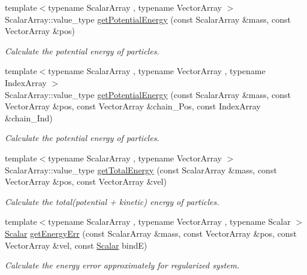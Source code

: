 \begin{DoxyCompactItemize}
{\footnotesize template$<$typename Scalar\+Array , typename Vector\+Array $>$ }\\Scalar\+Array\+::value\+\_\+type \mbox{\hyperlink{namespace_space_h_aecd56c4b16c8c9e47d4083c52db1640a}{get\+Potential\+Energy}} (const Scalar\+Array \&mass, const Vector\+Array \&pos)
\begin{DoxyCompactList}\small\item\em Calculate the potential energy of particles. \end{DoxyCompactList}\item 
{\footnotesize template$<$typename Scalar\+Array , typename Vector\+Array , typename Index\+Array $>$ }\\Scalar\+Array\+::value\+\_\+type \mbox{\hyperlink{namespace_space_h_a8796203b0c912b1137302096c8539cda}{get\+Potential\+Energy}} (const Scalar\+Array \&mass, const Vector\+Array \&pos, const Vector\+Array \&chain_\+Pos, const Index\+Array \&chain_\+Ind)
\begin{DoxyCompactList}\small\item\em Calculate the potential energy of particles. \end{DoxyCompactList}\item 
{\footnotesize template$<$typename Scalar\+Array , typename Vector\+Array $>$ }\\Scalar\+Array\+::value\+\_\+type \mbox{\hyperlink{namespace_space_h_aad574495853114033bac0925f29ced20}{get\+Total\+Energy}} (const Scalar\+Array \&mass, const Vector\+Array \&pos, const Vector\+Array \&vel)
\begin{DoxyCompactList}\small\item\em Calculate the total(potential + kinetic) energy of particles. \end{DoxyCompactList}\item 
{\footnotesize template$<$typename Scalar\+Array , typename Vector\+Array , typename Scalar $>$ }\\\mbox{\hyperlink{create_kepler_8cpp_a8c2981f3f834be9448a6ab06c28748eb}{Scalar}} \mbox{\hyperlink{namespace_space_h_af674a32e51a168974fbb76585ba803d9}{get\+Energy\+Err}} (const Scalar\+Array \&mass, const Vector\+Array \&pos, const Vector\+Array \&vel, const \mbox{\hyperlink{create_kepler_8cpp_a8c2981f3f834be9448a6ab06c28748eb}{Scalar}} bindE)
\begin{DoxyCompactList}\small\item\em Calculate the energy error approximately for regularized system. \end{DoxyCompactList}\item 

\end{DoxyCompactItemize}
